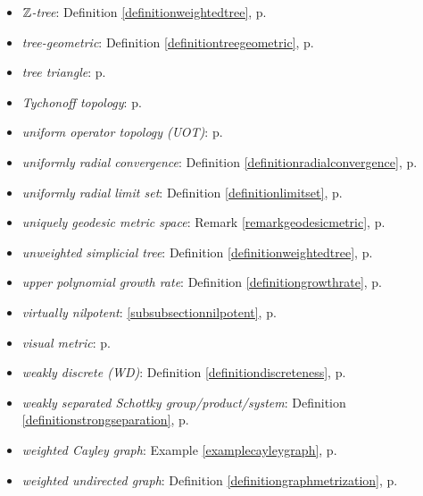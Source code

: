 \begin{itemize}
\item\emph{$\Z$-tree}: Definition \ref{definitionweightedtree}, p.\pageref{definitionweightedtree}
\item\emph{tree-geometric}: Definition \ref{definitiontreegeometric}, p.\pageref{definitiontreegeometric}
\item\emph{tree triangle}: p.\pageref{subsectionCAT}
\item\emph{Tychonoff topology}: p.\pageref{propositionCOTSOT}
\item\emph{uniform operator topology (UOT)}: p.\pageref{subsectiontopologies}
\item\emph{uniformly radial convergence}: Definition \ref{definitionradialconvergence}, p.\pageref{definitionradialconvergence}
\item\emph{uniformly radial limit set}: Definition \ref{definitionlimitset}, p.\pageref{definitionlimitset}
\item\emph{uniquely geodesic metric space}: Remark \ref{remarkgeodesicmetric}, p.\pageref{remarkgeodesicmetric}
\item\emph{unweighted simplicial tree}: Definition \ref{definitionweightedtree}, p.\pageref{definitionweightedtree}
\item\emph{upper polynomial growth rate}: Definition \ref{definitiongrowthrate}, p.\pageref{definitiongrowthrate}
\item\emph{virtually nilpotent}: \6\ref{subsubsectionnilpotent}, p.\pageref{subsubsectionnilpotent}
\item\emph{visual metric}: p.\pageref{propositionDist}
\item\emph{weakly discrete (WD)}: Definition \ref{definitiondiscreteness}, p.\pageref{definitiondiscreteness}
\item\emph{weakly separated Schottky group/product/system}: Definition \ref{definitionstrongseparation}, p.\pageref{definitionstrongseparation}
\item\emph{weighted Cayley graph}: Example \ref{examplecayleygraph}, p.\pageref{examplecayleygraph}
\item\emph{weighted undirected graph}: Definition \ref{definitiongraphmetrization}, p.\pageref{definitiongraphmetrization}
\end{itemize}

\endinput